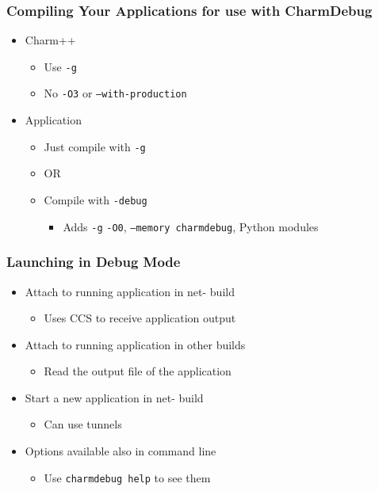 \begin{frame}[fragile]
  \frametitle{Compiling Your Applications for use with CharmDebug}
  \begin{itemize}
    \item Charm++
      \begin{itemize}
      \item Use \texttt{-g}
      \item No \texttt{­-O3} or \texttt{--with-production}
      \end{itemize}
    \item Application
      \begin{itemize}
      \item Just compile with \texttt{-g}
      \item OR
      \item Compile with \texttt{-debug}
        \begin{itemize}
        \item Adds \texttt{­-g} \texttt{-­O0}, \texttt{--memory charmdebug}, Python
          modules
        \end{itemize}
      \end{itemize}
  \end{itemize}
\end{frame}

\begin{frame}[fragile]
  \frametitle{Launching in Debug Mode}
  \begin{itemize}
    \item Attach to running application in net- build
      \begin{itemize}
      \item Uses CCS to receive application output
      \end{itemize}
    \item Attach to running application in other builds
      \begin{itemize}
      \item Read the output file of the application
      \end{itemize}
    \item Start a new application in net- build
      \begin{itemize}
      \item Can use tunnels
      \end{itemize}
    \item Options available also in command line
      \begin{itemize}
      \item Use \verb|charmdebug ­help| to see them
      \end{itemize}
  \end{itemize}
\end{frame}
